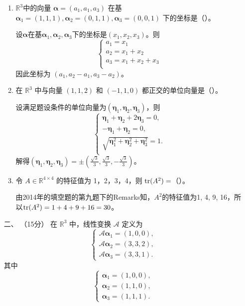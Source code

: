 \begin{enumerate}[1~]
\begin{enumerate}[1.~]
\item
$\mathbb{R}^3$中的向量 $\boldsymbol{\alpha} = \left( a _ { 1 } , a _ { 1 } , a _ { 3 } \right)$ 在基 $\boldsymbol{\alpha} _ { 1 } = ( 1, 1, 1 ) , \boldsymbol{\alpha} _ { 2 } = ( 0, 1, 1 ) , \boldsymbol{\alpha} _ { 3 } = ( 0, 0, 1 )$ 下的坐标是（\quad）。

\begin{solution}
设$\boldsymbol{\alpha}$在基$\boldsymbol{\alpha}_1, \boldsymbol{\alpha}_2, \boldsymbol{\alpha}_3$下的坐标是$(x_1, x_2, x_3)$。则\[
\left\{ \begin{array}{l}
	a_1=x_1\\
	a_2=x_1+x_2\\
	a_3=x_1+x_2+x_3\\
\end{array} \right. 
\]
因此坐标为 $(a_1, a_2-a_1, a_3-a_2)$。
\end{solution}

\item
在 $\mathbb{R}^3$ 中与向量 $(1, 1, 2)$ 和 $(−1, 1, 0)$ 都正交的单位向量是（\quad）。
\begin{solution}
设满足题设条件的单位向量为$(\boldsymbol{\eta}_1, \boldsymbol{\eta}_2, \boldsymbol{\eta}_3)$，则\[
\left\{ \begin{array}{l}
	\boldsymbol{\eta} _1+\boldsymbol{\eta} _2+2\boldsymbol{\eta} _3=0,\\
	-\boldsymbol{\eta} _1+\boldsymbol{\eta} _2=0,\\
	\sqrt{\boldsymbol{\eta}_1^2+\boldsymbol{\eta}_2^2+\boldsymbol{\eta}_3^2}=1.\\
\end{array} \right. 
\]
解得$(\boldsymbol{\eta}_1, \boldsymbol{\eta}_2, \boldsymbol{\eta}_3)=\pm(\frac{\sqrt{3}}{3}, \frac{\sqrt{3}}{3}, -\frac{\sqrt{3}}{3})$。
\end{solution}

\item
令 $A \in \mathbb { R } ^ { 4 \times 4 }$ 的特征值为 1，2，3，4，则 ${\rm tr}(A^2) =$（\quad）。

\begin{solution}
由2014年的填空题的第九题下的Remarks知，$A^2$的特征值为1, 4, 9, 16，所以${\rm tr}(A^2) =1+4+9+16=30$。
\end{solution}
\end{enumerate}

\item[二、]（15分）
在 $\mathbb{R}^3$ 中，线性变换 $\mathscr{A}$ 定义为
\[
\left\{ \begin{array} { l } { \mathscr { A } \boldsymbol{\alpha} _ { 1 } = ( 1,0,0 ) } ,\\ { \mathscr { A } \boldsymbol{\alpha} _ { 2 } = ( 3,3,2 ) } ,\\ { \mathscr { A } \boldsymbol{\alpha} _ { 3 } = ( 3,3,1 ) }. \end{array} \right.
\]
其中
\[
\left\{ \begin{array} { l } { \boldsymbol{\alpha} _ { 1 } = ( 1,0,0 ) }, \\ { \boldsymbol{\alpha} _ { 2 } = ( 1,1,0 ) }, \\ { \boldsymbol{\alpha} _ { 3 } = ( 1,1,1 ) }. \end{array} \right.
\]


\end{enumerate}
